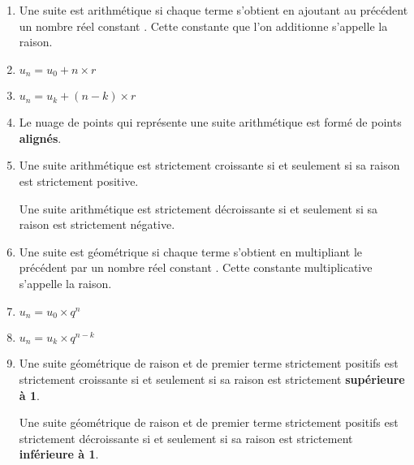 \begin{corrige}
     \begin{enumerate}
          \item
          Une suite est arithmétique si chaque terme s'obtient en ajoutant au précédent un nombre réel constant . Cette constante que l'on additionne s'appelle la raison.
          \item
          $u_{n}=u_{0}+n\times r$
          \item
          $u_{n}=u_{k}+\left(n-k\right)\times r$
          \item
          Le nuage de points qui représente une suite arithmétique est formé de points \textbf{alignés}.
          \item
          Une suite arithmétique est strictement croissante si et seulement si sa raison est strictement positive.
          \par
          Une suite arithmétique est strictement décroissante si et seulement si sa raison est strictement négative.
          \item
          Une suite est  géométrique si chaque terme s'obtient en multipliant le précédent par un nombre réel constant . Cette constante multiplicative s'appelle la raison.
          \item
          $u_{n}=u_{0}\times q^{n}$
          \item
          $u_{n}=u_{k}\times q^{n-k}$
          \item
          Une suite géométrique de raison et de premier terme strictement positifs est strictement croissante si et seulement si sa raison est strictement \textbf{supérieure à 1}.
          \par
          Une suite géométrique de raison et de premier terme strictement positifs est strictement décroissante si et seulement si sa raison est strictement \textbf{inférieure à 1}.
     \end{enumerate}
\end{corrige}
